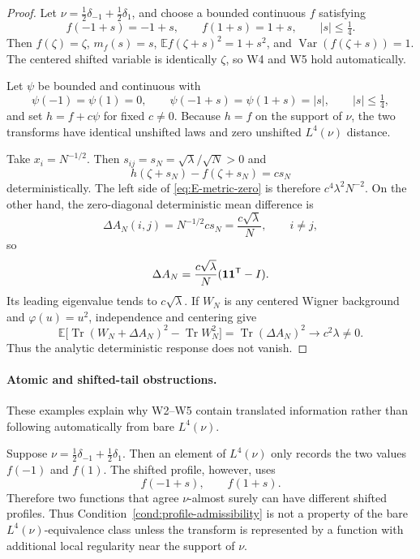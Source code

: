 \documentclass[10pt,a4paper]{amsart}
\newcommand{\E}{\mathbb E}
\newcommand{\Var}{\operatorname{Var}}
\newcommand{\Tr}{\operatorname{Tr}}
\begin{document}
\begin{proof}
Let \(\nu=\frac12\delta_{-1}+\frac12\delta_1\), and choose a bounded continuous \(f\) satisfying
\[
        f(-1+s)=-1+s,
        \qquad
        f(1+s)=1+s,
        \qquad |s|\le\tfrac14.
\]
Then \(f(\zeta)=\zeta\), \(m_f(s)=s\), \(\E f(\zeta+s)^2=1+s^2\), and \(\Var(f(\zeta+s))=1\).  The centered shifted variable is identically \(\zeta\), so W4 and W5 hold automatically.

Let \(\psi\) be bounded and continuous with
\[
        \psi(-1)=\psi(1)=0,
        \qquad
        \psi(-1+s)=\psi(1+s)=|s|,
        \qquad |s|\le\tfrac14,
\]
and set \(h=f+c\psi\) for fixed \(c\ne0\).  Because \(h=f\) on the support of \(\nu\), the two transforms have identical unshifted laws and zero unshifted \(L^4(\nu)\) distance.

Take \(x_i=N^{-1/2}\).  Then \(s_{ij}=s_N=\sqrt\lambda/\sqrt N>0\) and
\[
        h(\zeta+s_N)-f(\zeta+s_N)=cs_N
\]
deterministically.  The left side of \eqref{eq:E-metric-zero} is therefore \(c^4\lambda^2N^{-2}\).  On the other hand, the zero-diagonal deterministic mean difference is
\[
        \Delta A_N(i,j)=N^{-1/2}cs_N=\frac{c\sqrt\lambda}{N},
        \qquad i\ne j,
\]
so
\[
        \Delta A_N=\frac{c\sqrt\lambda}{N}
        ({\bf 1}{\bf 1}^{\mathsf T}-I).
\]
Its leading eigenvalue tends to \(c\sqrt\lambda\).  If \(W_N\) is any centered Wigner background and \(\varphi(u)=u^2\), independence and centering give
\[
        \E\bigl[\Tr(W_N+\Delta A_N)^2-\Tr W_N^2\bigr]
        =\Tr(\Delta A_N)^2\longrightarrow c^2\lambda\ne0.
\]
Thus the analytic deterministic response does not vanish.
\end{proof}

\paragraph{Atomic and shifted-tail obstructions.}
These examples explain why W2--W5 contain translated information rather than following automatically from bare \(L^4(\nu)\).


Suppose \(\nu=\frac12\delta_{-1}+\frac12\delta_1\).  Then an element of \(L^4(\nu)\) only records the two values \(f(-1)\) and \(f(1)\).  The shifted profile, however, uses
\[
        f(-1+s),
        \qquad
        f(1+s).
\]
Therefore two functions that agree \(\nu\)-almost surely can have different shifted profiles.  Thus Condition~\ref{cond:profile-admissibility} is not a property of the bare \(L^4(\nu)\)-equivalence class unless the transform is represented by a function with additional local regularity near the support of \(\nu\).
\end{document}
